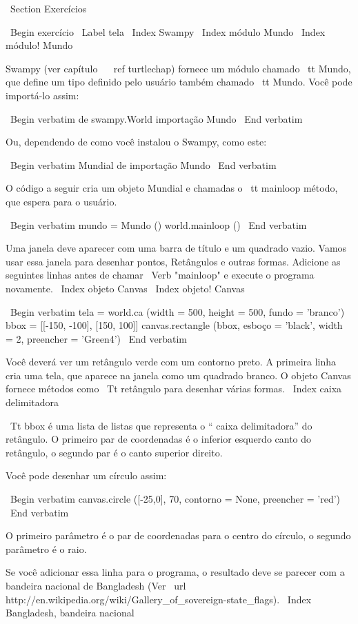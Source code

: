 \documentclass[10pt]{book}
\begin{document}
{{{{{{{{{{{{{\ Section {Exercícios}

\ Begin {} exercício
\ Label {tela}
\ Index {} Swampy
\ Index {módulo Mundo}
\ Index {módulo! Mundo}

Swampy (ver capítulo ~ \ ref {turtlechap}) fornece um módulo chamado {\ tt
  Mundo}, que define um tipo definido pelo usuário também chamado {\ tt Mundo}.
Você pode importá-lo assim:

\ Begin {verbatim}
de swampy.World importação Mundo
\ End {verbatim}

Ou, dependendo de como você instalou o Swampy, como este:

\ Begin {verbatim}
Mundial de importação Mundo
\ End {verbatim}

O código a seguir cria um objeto Mundial e chamadas
o {\ tt mainloop} método, que
espera para o usuário.

\ Begin {verbatim}
mundo = Mundo ()
world.mainloop ()
\ End {verbatim}

Uma janela deve aparecer com uma barra de título e um quadrado vazio.
Vamos usar essa janela para desenhar pontos,
Retângulos e outras formas.  
Adicione as seguintes linhas antes de chamar
\ Verb "mainloop" e execute o programa novamente.
\ Index {objeto Canvas}
\ Index {objeto! Canvas}

\ Begin {verbatim}
tela = world.ca (width = 500, height = 500, fundo = 'branco')
bbox = [[-150, -100], [150, 100]]
canvas.rectangle (bbox, esboço = 'black', width = 2, preencher = 'Green4')
\ End {verbatim}

Você deverá ver um retângulo verde com um contorno preto.
A primeira linha cria uma tela, que aparece na janela
como um quadrado branco. O objeto Canvas fornece métodos como
{\ Tt retângulo} para desenhar várias formas.
\ Index {caixa delimitadora}

{\ Tt bbox} é uma lista de listas que representa o `` caixa delimitadora''
do retângulo. O primeiro par de coordenadas é o inferior esquerdo
canto do retângulo, o segundo par é o canto superior direito.

Você pode desenhar um círculo assim:

\ Begin {verbatim}
canvas.circle ([-25,0], 70, contorno = None, preencher = 'red')
\ End {verbatim}

O primeiro parâmetro é o par de coordenadas para o centro do
círculo, o segundo parâmetro é o raio.

Se você adicionar essa linha para o programa, 
o resultado deve se parecer com a bandeira nacional de Bangladesh
(Ver \ url {http://en.wikipedia.org/wiki/Gallery_of_sovereign-state_flags}).
\ Index {Bangladesh, bandeira nacional}

}}}}}}}}}}}}}
\end{document}
